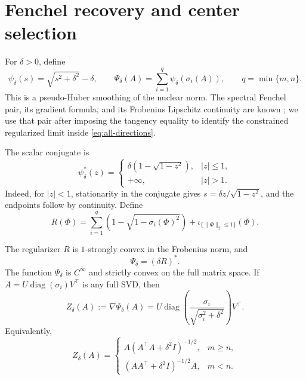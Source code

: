 \section{Fenchel recovery and center selection}
\label{sec:smoothing}

For \(\delta>0\), define
\begin{equation}
 \psi_\delta(s)=\sqrt{s^2+\delta^2}-\delta,
 \qquad
 \Psi_\delta(A)=\sum_{i=1}^{q}\psi_\delta(\sigma_i(A)),
 \qquad q=\min\{m,n\}.
 \label{eq:Psi-main}
\end{equation}
This is a pseudo-Huber smoothing of the nuclear norm.  The spectral Fenchel
pair, its gradient formula, and its Frobenius Lipschitz continuity are known
\citep{mustafi2026move,lobos2025smooth,feoktistov2026softsign}; we use that
pair after imposing the tangency equality to identify the constrained
regularized limit inside \eqref{eq:all-directions}.

The scalar conjugate is
\begin{equation}
 \psi_\delta^*(z)=
 \begin{cases}
 \delta(1-\sqrt{1-z^2}),&|z|\le1,\\
 +\infty,&|z|>1.
 \end{cases}
 \label{eq:scalar-conjugate-main}
\end{equation}
Indeed, for \(|z|<1\), stationarity in the conjugate gives
\(s=\delta z/\sqrt{1-z^2}\), and the endpoints follow by continuity.
Define
\begin{equation}
 R(\Phi)=
 \sum_{i=1}^{q}\left(1-\sqrt{1-\sigma_i(\Phi)^2}\right)
 +\iota_{\{\|\Phi\|_2\le1\}}(\Phi).
 \label{eq:R-main}
\end{equation}

\begin{lemma}
\label{lem:conjugacy}
The regularizer \(R\) is \(1\)-strongly convex in the Frobenius norm, and
\begin{equation}
 \Psi_\delta=(\delta R)^*.
 \label{eq:matrix-conjugacy-main}
\end{equation}
The function \(\Psi_\delta\) is \(C^\infty\) and strictly convex on the full
matrix space.  If \(A=U\operatorname{diag}(\sigma_i)V^\top\) is any full SVD,
then
\begin{equation}
 Z_\delta(A):=\nabla\Psi_\delta(A)
 =U\operatorname{diag}\left(
 \frac{\sigma_i}{\sqrt{\sigma_i^2+\delta^2}}
 \right)V^\top.
 \label{eq:Zdelta}
\end{equation}
Equivalently,
\begin{equation}
 Z_\delta(A)=
 \begin{cases}
 A(A^\top A+\delta^2I)^{-1/2},&m\ge n,\\
 (AA^\top+\delta^2I)^{-1/2}A,&m<n.
 \end{cases}
 \label{eq:Zdelta-coordinate-free}
\end{equation}
\end{lemma}

